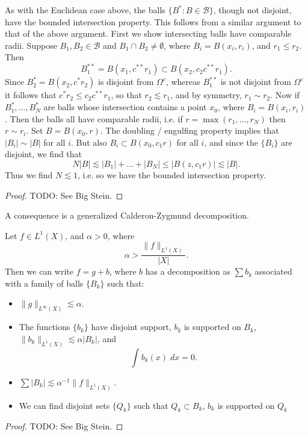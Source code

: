\begin{remark}
    As with the Euclidean case above, the balls $\{ B^* : B \in \mathcal{B} \}$, though not disjoint, have the bounded intersection property. This follows from a similar argument to that of the above argument. First we show intersecting balls have comparable radii. Suppose $B_1, B_2 \in \mathcal{B}$ and $B_1 \cap B_2 \neq \emptyset$, where $B_i = B(x_i,r_i)$, and $r_1 \leq r_2$. Then
    \[ B_1^{**} = B(x_1, c^{**} r_1) \subset B(x_2, c_2 c^{**} r_1). \]
    Since $B_2^* = B(x_2, c^* r_2)$ is disjoint from $\Omega^c$, whereas $B_1^{**}$ is not disjoint from $\Omega^c$ it follows that $c^* r_2 \leq c_2 c^{**} r_1$, so that $r_2 \lesssim r_1$, and by symmetry, $r_1 \sim r_2$. Now if $B_1^*, \dots, B_N^*$ are balls whose intersection contains a point $x_0$, where $B_i = B(x_i,r_i)$. Then the balls all have comparable radii, i.e. if $r = \max(r_1,\dots,r_N)$ then $r \sim r_i$. Set $B = B(x_0,r)$. The doubling / engulfing property implies that $|B_i| \sim |B|$ for all $i$. But also $B_i \subset B(x_0,c_1 r)$ for all $i$, and since the $\{ B_i \}$ are disjoint, we find that
    \[ N |B| \lesssim |B_1| + \dots + |B_N| \leq |B(z,c_1 r)| \lesssim |B|. \]
    Thus we find $N \lesssim 1$, i.e. so we have the bounded intersection property.
\end{remark}

\begin{proof}
    TODO: See Big Stein.
\end{proof}

A consequence is a generalized Calderon-Zygmund decomposition.

\begin{theorem}
    Let $f \in L^1(X)$, and $\alpha > 0$, where
    \[ \alpha > \frac{\| f \|_{L^1(X)}}{|X|}. \]
    Then we can write $f = g + b$, where $b$ has a decomposition as $\sum b_k$ associated with a family of balls $\{ B_k \}$ such that:
    \begin{itemize}
        \item $\| g \|_{L^\infty(X)} \lesssim \alpha$.

        \item The functions $\{ b_k \}$ have disjoint support, $b_k$ is supported on $B_k$, $\| b_k \|_{L^1(X)} \lesssim \alpha |B_k|$, and
        \[ \int b_k(x)\; dx = 0. \]
        
        \item $\sum |B_k| \lesssim \alpha^{-1} \| f \|_{L^1(X)}$.

        \item We can find disjoint sets $\{ Q_k \}$ such that $Q_k \subset B_k$, $b_k$ is supported on $Q_k$
    \end{itemize}
\end{theorem}
\begin{proof}
    TODO: See Big Stein.
\end{proof}

